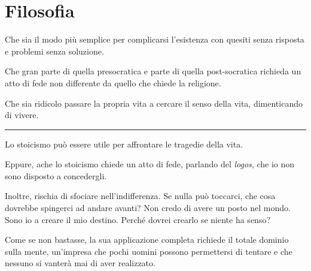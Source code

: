 \chapter{Filosofia}
\label{ch:filosofia}

Che sia il modo più semplice per complicarsi l'esistenza con quesiti senza
risposta e problemi senza soluzione.

Che gran parte di quella presocratica e parte di quella post-socratica richieda
un atto di fede non differente da quello che chiede la religione.

Che sia ridicolo passare la propria vita a cercare il senso della vita,
dimenticando di vivere.

\plainbreak{1}

Lo stoicismo può essere utile per affrontare le tragedie della vita.

Eppure, ache lo stoicismo chiede un atto di fede, parlando del \emph{logos}, che
io non sono disposto a concedergli.

Inoltre, rischia di sfociare nell'indifferenza. Se nulla può toccarci, che cosa
dovrebbe spingerci ad andare avanti? Non credo di avere un posto nel mondo. Sono
io a creare il mio destino. Perché dovrei crearlo se niente ha senso?

Come se non bastasse, la sua applicazione completa richiede il totale dominio
sulla mente, un'impresa che pochi uomini possono permettersi di tentare e che
nessuno si vanterà mai di aver realizzato.
